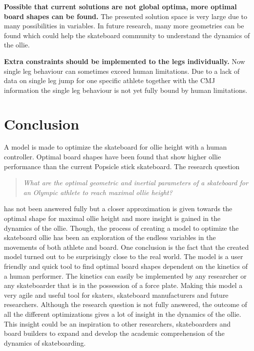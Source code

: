 \documentclass[default,iicol]{sn-jnl}
\begin{document}
{\noindent\textbf{Possible that current solutions are not global optima, more optimal board shapes can be found.} The presented solution space is very large due to many possibilities in variables. In future research, many more geometries can be found which could help the skateboard community to understand the dynamics of the ollie. 

\noindent\textbf{Extra constraints should be implemented to the legs individually.} Now single leg behaviour can sometimes exceed human limitations. Due to a lack of data on single leg jump for one specific athlete together with the CMJ information the single leg behaviour is not yet fully bound by human limitations.

\section{Conclusion}
\noindent A model is made to optimize the skateboard for ollie height with a human controller. Optimal board shapes have been found that show higher ollie performance than the current Popsicle stick skateboard. The research question 
\begin{quote}
\textit{What are the optimal geometric and inertial parameters of a skateboard for an Olympic athlete to reach maximal ollie height? 
}\end{quote}
has not been answered fully but a closer approximation is given towards the optimal shape for maximal ollie height and more insight is gained in the dynamics of the ollie. Though, the process of creating a model to optimize the skateboard ollie has been an exploration of the endless variables in the movements of both athlete and board. One conclusion is the fact that the created model turned out to be surprisingly close to the real world. The model is a user friendly and quick tool to find optimal board shapes dependent on the kinetics of a human performer. The kinetics can easily be implemented by any researcher or any skateboarder that is in the possession of a force plate. Making this model a very agile and useful tool for skaters, skateboard manufacturers and future researchers. Although the research question is not fully answered, the outcome of all the different optimizations gives a lot of insight in the dynamics of the ollie. This insight could be an inspiration to other researchers, skateboarders and board builders to expand and develop the academic comprehension of the dynamics of skateboarding. 




}
\end{document}
